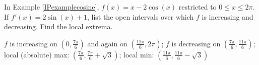 \documentclass{ximera}
\begin{document}
\begin{problem} \label{IPexamplecosineincdec}
In Example \ref{IPexamplecosine},  $f(x) =x-2\cos(x)$ restricted to $0 \leq x \leq 2\pi$.  If $f'(x) = 2\sin(x)+1$, list the open intervals over which $f$ is increasing and decreasing.  Find the local extrema. 

\begin{solution}
$f$ is increasing on $\left(0, \frac{7\pi}{6} \right)$ and again on $\left(\frac{11\pi}{6}, 2\pi \right)$;  $f$ is decreasing on  $\left(\frac{7 \pi}{6}, \frac{11\pi}{6} \right)$; local (absolute) max:  $\left(\frac{7\pi}{6}, \frac{7\pi}{6} + \sqrt{3}\right)$; local min:  $\left(\frac{11\pi}{6}, \frac{11\pi}{6} - \sqrt{3}\right)$
\end{solution}
\end{problem}
\end{document}
